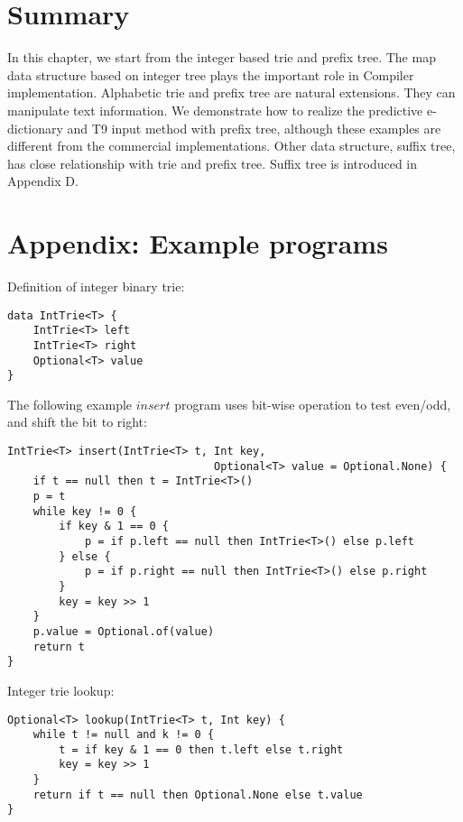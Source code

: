 \documentclass[b5paper]{article}
\begin{document}
\section{Summary}

In this chapter, we start from the integer based trie and prefix tree. The
map data structure based on integer tree plays the important role
in Compiler implementation. Alphabetic trie and prefix tree are
natural extensions. They can manipulate text information.
We demonstrate how to realize the predictive e-dictionary
and T9 input method with prefix tree, although these examples
are different from the commercial implementations.
Other data structure, suffix tree, has close
relationship with trie and prefix tree. Suffix tree is introduced
in Appendix D.

\section{Appendix: Example programs}

Definition of integer binary trie:

\begin{lstlisting}[language = Bourbaki]
data IntTrie<T> {
    IntTrie<T> left
    IntTrie<T> right
    Optional<T> value
}
\end{lstlisting}

The following example $insert$ program uses bit-wise operation to test even/odd, and shift the bit to right:

\begin{lstlisting}[language = Bourbaki]
IntTrie<T> insert(IntTrie<T> t, Int key,
                                Optional<T> value = Optional.None) {
    if t == null then t = IntTrie<T>()
    p = t
    while key != 0 {
        if key & 1 == 0 {
            p = if p.left == null then IntTrie<T>() else p.left
        } else {
            p = if p.right == null then IntTrie<T>() else p.right
        }
        key = key >> 1
    }
    p.value = Optional.of(value)
    return t
}
\end{lstlisting}

Integer trie lookup:

\begin{lstlisting}[language = Bourbaki]
Optional<T> lookup(IntTrie<T> t, Int key) {
    while t != null and k != 0 {
        t = if key & 1 == 0 then t.left else t.right
        key = key >> 1
    }
    return if t == null then Optional.None else t.value
}
\end{lstlisting}
\end{document}
